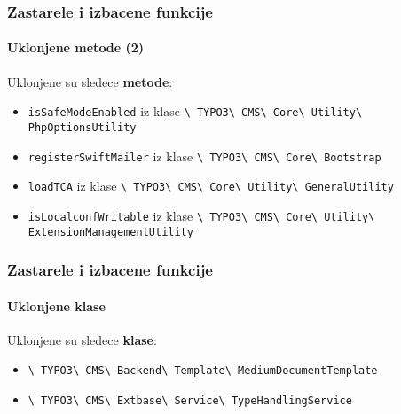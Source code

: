 \begin{frame}[fragile]
	\frametitle{Zastarele i izbacene funkcije}
	\framesubtitle{Uklonjene metode (2)}

	Uklonjene su sledece \textbf{metode}:

	\begin{itemize}

		\item
			\small
				\texttt{isSafeModeEnabled}\newline
				iz klase
				\texttt{\textbackslash
					TYPO3\textbackslash
					CMS\textbackslash
					Core\textbackslash
					Utility\textbackslash
					PhpOptionsUtility}
			\normalsize
		\item
			\small
				\texttt{registerSwiftMailer}\newline
				iz klase
				\texttt{\textbackslash
					TYPO3\textbackslash
					CMS\textbackslash
					Core\textbackslash
					Bootstrap}
			\normalsize
		\item
			\small
				\texttt{loadTCA}\newline
				iz klase
				\texttt{\textbackslash
					TYPO3\textbackslash
					CMS\textbackslash
					Core\textbackslash
					Utility\textbackslash
					GeneralUtility}
			\normalsize
		\item
			\small
				\texttt{isLocalconfWritable}\newline
				iz klase
				\texttt{\textbackslash
					TYPO3\textbackslash
					CMS\textbackslash
					Core\textbackslash
					Utility\textbackslash
					ExtensionManagementUtility}
			\normalsize

	\end{itemize}

\end{frame}


\begin{frame}[fragile]
	\frametitle{Zastarele i izbacene funkcije}
	\framesubtitle{Uklonjene klase}

	Uklonjene su sledece \textbf{klase}:

	\begin{itemize}

		\item
			\smaller
				\texttt{\textbackslash
					TYPO3\textbackslash
					CMS\textbackslash
					Backend\textbackslash
					Template\textbackslash
					MediumDocumentTemplate}
			\normalsize
		\item
			\smaller
				\texttt{\textbackslash
					TYPO3\textbackslash
					CMS\textbackslash
					Extbase\textbackslash
					Service\textbackslash
					TypeHandlingService}
			\normalsize

	\end{itemize}

\end{frame}

